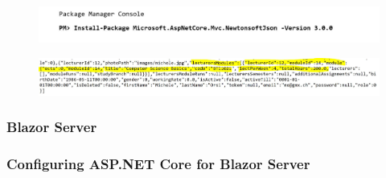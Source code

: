 \documentclass{scrartcl}
\begin{document}
\begin{figure}[H]
\centering
\includegraphics[width=150mm]{report_img/complex_data_problem/install_newtonsoft_json}
\caption{}
\label{blabla}
\end{figure}

\noindent                                                                %
\begin{minipage}{\linewidth}                            %
\label{visina8                                                      }%
\end{minipage}




\begin{figure}[H]
\centering
\includegraphics[width=150mm]{report_img/complex_data_problem/michele_module_ok}
\caption{}
\label{blabla}
\end{figure}

\subsubsection{Blazor Server}
\subsubsection{Configuring ASP.NET Core for Blazor Server}
\end{document}
